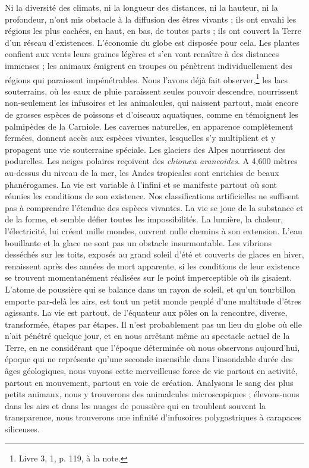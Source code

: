 \documentclass[a4paper, 11pt, oneside]{article}
\begin{document}
Ni la diversité des climats, ni la longueur des distances, ni la hauteur, ni la profondeur, n'ont mis obstacle à la diffusion des êtres vivants ; ils ont envahi les régions les plus cachées, en haut, en bas, de toutes parts ; ils ont couvert la Terre d'un réseau d'existences. L'économie du globe est disposée pour cela. Les plantes confient aux vents leurs graines légères et s'en vont renaître à des distances immenses ; les animaux émigrent en troupes ou pénètrent individuellement des régions qui paraissent impénétrables. Nous l'avons déjà fait observer,\footnote{Livre 3, 1, p. 119, à la note.} les lacs souterrains, où les eaux de pluie paraissent seules pouvoir descendre, nourrissent non-seulement les infusoires et les animalcules, qui naissent partout, mais encore de grosses espèces de poissons et d'oiseaux aquatiques, comme en témoignent les palmipèdes de la Carniole. Les cavernes naturelles, en apparence complètement fermées, donnent accès aux espèces vivantes, lesquelles s'y multiplient et y propagent une vie souterraine spéciale. Les glaciers des Alpes nourrissent des podurelles. Les neiges polaires reçoivent des \emph{chionæa araneoides}. A 4,600 mètres au-dessus du niveau de la mer, les Andes tropicales sont enrichies de beaux phanérogames. La vie est variable à l'infini et se manifeste partout où sont réunies les conditions de son existence. Nos classifications artificielles ne suffisent pas à comprendre l'étendue des espèces vivantes. La vie se joue de la substance et de la forme, et semble défier toutes les impossibilités. La lumière, la chaleur, l'électricité, lui créent mille mondes, ouvrent nulle chemins à son extension. L'eau bouillante et la glace ne sont pas un obstacle insurmontable. Les vibrions desséchés sur les toits, exposés au grand soleil d'été et couverts de glaces en hiver, renaissent après des années de mort apparente, si les conditions de leur existence se trouvent momentanément réalisées sur le point imperceptible où ils gisaient. L'atome de poussière qui se balance dans un rayon de soleil, et qu'un tourbillon emporte par-delà les airs, est tout un petit monde peuplé d'une multitude d'êtres agissants. La vie est partout, de l'équateur aux pôles on la rencontre, diverse, transformée, étapes par étapes. Il n'est probablement pas un lieu du globe où elle n'ait pénétré quelque jour, et en nous arrêtant même au spectacle actuel de la Terre, en ne considérant que l'époque déterminée où nous observons aujourd'hui, époque qui ne représente qu'une seconde insensible dans l'insondable durée des âges géologiques, nous voyons cette merveilleuse force de vie partout en activité, partout en mouvement, partout en voie de création. Analysons le sang des plus petits animaux, nous y trouverons des animalcules microscopiques ; élevons-nous dans les airs et dans les nuages de poussière qui en troublent souvent la transparence, nous trouverons une infinité d'infusoires polygastriques à carapaces siliceuses.
\end{document}
